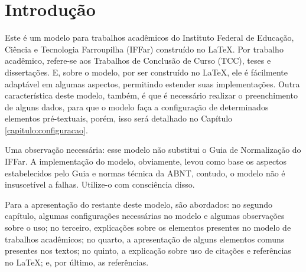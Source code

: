 \chapter{Introdução}
Este é um modelo para trabalhos acadêmicos do Instituto Federal de Educação, Ciência e Tecnologia Farroupilha (IFFar) construído no \LaTeX{}. Por trabalho acadêmico, refere-se aos Trabalhos de Conclusão de Curso (TCC), teses e dissertações. E, sobre o modelo, por ser construído no \LaTeX, ele é fácilmente adaptável em algumas aspectos, permitindo estender suas implementações. Outra característica deste modelo, também, é que é necessário realizar o preenchimento de alguns dados, para que o modelo faça a configuração de determinados elementos pré-textuais, porém, isso será detalhado no Capítulo \ref{capitulo:configuracao}.

Uma observação necessária: esse modelo não substitui o Guia de Normalização do IFFar. A implementação do modelo, obviamente, levou como base os aspectos estabelecidos pelo Guia e normas técnica da ABNT, contudo, o modelo não é insuscetível a falhas. Utilize-o com consciência disso.

Para a apresentação do restante deste modelo, são abordados: no segundo capítulo, algumas configurações necessárias no modelo e algumas observações sobre o uso; no terceiro, explicações sobre os elementos presentes no modelo de trabalhos acadêmicos; no quarto, a apresentação de alguns elementos comuns presentes nos textos; no quinto, a explicação sobre uso de citações e referências no \LaTeX; e, por último, as referências.